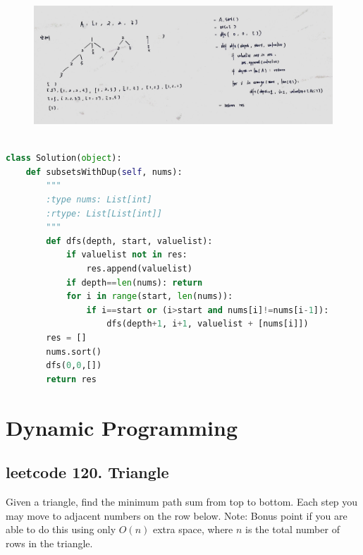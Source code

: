 \documentclass[a4paper,10pt]{article}
\begin{document}
\begin{figure}[h]
    \includegraphics[width=\textwidth]{leetcode90.jpg}
    \centering \\
\end{figure}

\begin{lstlisting}[language=Python, caption=Problem90. Subsets II]

class Solution(object):
    def subsetsWithDup(self, nums):
        """
        :type nums: List[int]
        :rtype: List[List[int]]
        """
        def dfs(depth, start, valuelist):
            if valuelist not in res:
                res.append(valuelist)
            if depth==len(nums): return
            for i in range(start, len(nums)):
                if i==start or (i>start and nums[i]!=nums[i-1]):
                    dfs(depth+1, i+1, valuelist + [nums[i]])
        res = []
        nums.sort()
        dfs(0,0,[])
        return res
\end{lstlisting}










\section{Dynamic Programming}

\subsection{leetcode 120. Triangle}
Given a triangle, find the minimum path sum from top to bottom. Each step you may move to adjacent numbers on the row below. Note: Bonus point if you are able to do this using only $O(n)$ extra space, where $n$ is the total number of rows in the triangle. \\
\end{document}
